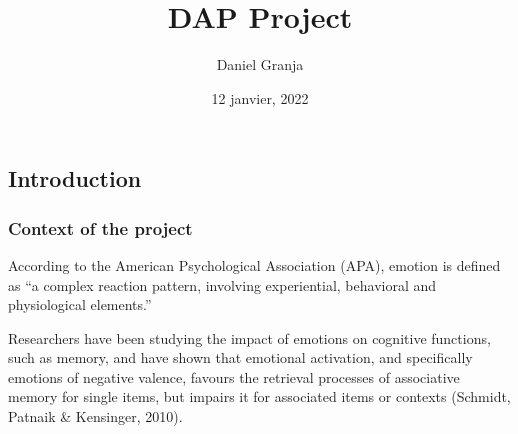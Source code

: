 \documentclass[
]{article}
\title{DAP Project}
\author{Daniel Granja}
\date{12 janvier, 2022}
\newenvironment{Shaded}{\begin{snugshade}}{\end{snugshade}}
\newcommand{\AttributeTok}[1]{\textcolor[rgb]{0.77,0.63,0.00}{#1}}
\newcommand{\CommentTok}[1]{\textcolor[rgb]{0.56,0.35,0.01}{\textit{#1}}}
\newcommand{\ConstantTok}[1]{\textcolor[rgb]{0.00,0.00,0.00}{#1}}
\newcommand{\ControlFlowTok}[1]{\textcolor[rgb]{0.13,0.29,0.53}{\textbf{#1}}}
\newcommand{\FunctionTok}[1]{\textcolor[rgb]{0.00,0.00,0.00}{#1}}
\newcommand{\NormalTok}[1]{#1}
\newcommand{\OtherTok}[1]{\textcolor[rgb]{0.56,0.35,0.01}{#1}}
\newcommand{\SpecialCharTok}[1]{\textcolor[rgb]{0.00,0.00,0.00}{#1}}
\newcommand{\StringTok}[1]{\textcolor[rgb]{0.31,0.60,0.02}{#1}}
\begin{document}
\maketitle

{
\setcounter{tocdepth}{2}
\tableofcontents
}
\begin{Shaded}
\end{Shaded}

\hypertarget{introduction}{%
\subsection{Introduction}\label{introduction}}

\hypertarget{context-of-the-project}{%
\subsubsection{Context of the project}\label{context-of-the-project}}

According to the American Psychological Association (APA), emotion is
defined as ``a complex reaction pattern, involving experiential,
behavioral and physiological elements.''

Researchers have been studying the impact of emotions on cognitive
functions, such as memory, and have shown that emotional activation, and
specifically emotions of negative valence, favours the retrieval
processes of associative memory for single items, but impairs it for
associated items or contexts (Schmidt, Patnaik \& Kensinger, 2010).
\end{document}
